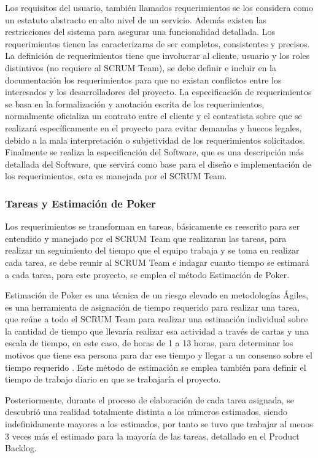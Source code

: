 Los requisitos del usuario, también llamados requerimientos se los considera como un estatuto abstracto en alto nivel de un servicio. Además existen las restricciones del sistema para asegurar una funcionalidad detallada. Los requerimientos tienen las caracterizaras de ser completos, consistentes y precisos. 
La definición de requerimientos tiene que involucrar al cliente, usuario y los roles distintivos (no requiere al SCRUM Team), se debe definir e incluir en la documentación los requerimientos para que no existan conflictos entre los interesados y los desarrolladores del proyecto.
La especificación de requerimientos se basa en la formalización y anotación escrita de los requerimientos, normalmente oficializa un contrato entre el cliente y el contratista sobre que se realizará específicamente en el proyecto para evitar demandas y huecos legales, debido a la mala interpretación o subjetividad de los requerimientos solicitados.
Finalmente se realiza la especificación del Software, que es una descripción más detallada del Software, que servirá como base para el diseño e implementación de los requerimientos, esta es manejada por el SCRUM Team.

\subsubsection{Tareas y Estimación de Poker}

Los requerimientos se transforman en tareas, básicamente es reescrito para ser entendido y manejado por el SCRUM Team que realizaran las tareas, para realizar un seguimiento del tiempo que el equipo trabaja y se toma en realizar cada tarea, se debe reunir al SCRUM Team e indagar cuanto tiempo se estimará a cada tarea, para este proyecto, se emplea el método Estimación de Poker.

Estimación de Poker es una técnica de un riesgo elevado en metodologías Ágiles, es una herramienta de asignación de tiempo requerido para realizar una tarea, que reúne a todo el SCRUM Team para realizar una estimación individual sobre la cantidad de tiempo que llevaría realizar esa actividad a través de cartas y una escala de tiempo, en este caso, de horas de 1 a 13 horas, para determinar los motivos que tiene esa persona para dar ese tiempo y llegar a un consenso sobre el tiempo requerido \cite{scrumdiapo}. Este método de estimación se emplea también para definir el tiempo de trabajo diario en que se trabajaría el proyecto.

Posteriormente, durante el proceso de elaboración de cada tarea asignada, se descubrió una realidad totalmente distinta a los números estimados, siendo indefinidamente mayores a los estimados, por tanto se tuvo que trabajar al menos 3 veces más el estimado para la mayoría de las tareas, detallado en el Product Backlog.

